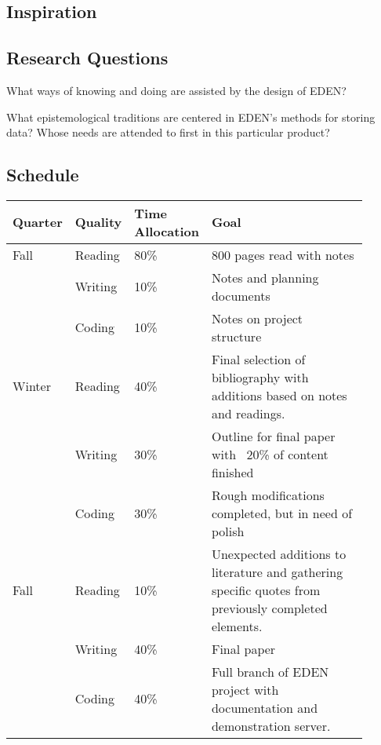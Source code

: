 \documentclass[a4paper,man,natbib]{apa6}
\begin{document}
   \subsection*{Inspiration}

   \subsection*{Research Questions}
   What ways of knowing and doing are assisted by the design of EDEN?

   What epistemological traditions are centered in EDEN's methods for storing data? Whose needs are attended to first in this particular product?
   \subsection*{Schedule}
   \begin{center}
   \begin{tabular}{|l|p{0.1\linewidth}|p{0.1\linewidth}|p{0.7\linewidth}|}
   \hline
   Quarter & Quality & Time Allocation & Goal                         \\ \hline
   Fall    & Reading & 80\%            & 800 pages read with notes    \\ \cline{2-4} 
           & Writing & 10\%            & Notes and planning documents \\ \cline{2-4} 
           & Coding  & 10\%            & Notes on project structure   \\ \hline 
   Winter  & Reading & 40\%            & Final selection of bibliography with additions based on notes and readings.   \\ \cline{2-4} 
           & Writing & 30\%            & Outline for final paper with ~20\% of content finished \\ \cline{2-4} 
           & Coding  & 30\%            & Rough modifications completed, but in need of polish  \\ \hline
   Fall    & Reading & 10\%            & Unexpected additions to literature and gathering specific quotes from previously completed elements.   \\ \cline{2-4} 
           & Writing & 40\%            & Final paper \\ \cline{2-4}
           & Coding  & 40\%            & Full branch of EDEN project with documentation and demonstration server. \\ \hline
   \end{tabular}
   \end{center}
\end{document}
